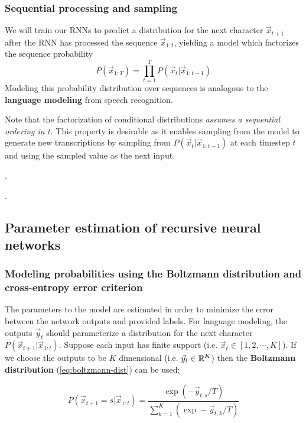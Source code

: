 \subsubsection{Sequential processing and sampling}

We will train our RNNs to predict a distribution for the next character
$\vec{x}_{t+1}$ after the RNN has processed the sequence $\vec{x}_{1:t}$,
yielding a model which factorizes the sequence probability
\begin{equation}
    P(\vec{x}_{1:T}) = \prod_{t=1}^T P(\vec{x}_t | \vec{x}_{1:t-1} )
\end{equation}
Modeling this probability distribution over sequences is analogous to the
\textbf{language modeling} from speech recognition.

Note that the factorization of conditional distributions \emph{assumes a
sequential ordering in $t$}. This property is desirable as it enables sampling
from the model to generate new transcriptions by sampling from $P(\vec{x}_t |
\vec{x}_{1:t-1})$ at each timestep $t$ and using the sampled value as the next
input.

.

.

\subsection{Parameter estimation of recursive neural networks}

\subsubsection{Modeling probabilities using the Boltzmann distribution and cross-entropy error criterion}

The parameters to the model are estimated in order to minimize the error
between the network outputs and provided labels. For language modeling, the
outputs $\vec{y}_t$ should parameterize a distribution for the next character
$P(\vec{x}_{t+1} | \vec{x}_{1:t})$. Suppose each input has finite support (i.e.
$\vec{x}_t \in [1,2,\cdots,K]$). If we choose the outputs to be $K$ dimensional
(i.e. $\vec{y}_t \in \mathbb{R}^K$) then the \textbf{Boltzmann distribution}
(\autoref{eq:boltzmann-dist}) can be used:

\begin{equation}
    \label{eq:boltzmann-dist}
    P(\vec{x}_{t+1} = s | \vec{x}_{1:t})
    = \frac{\exp \left(-\vec{y}_{t,s}/T\right) }{ \sum_{k=1}^{K} \left(\exp -\vec{y}_{t,k}/T\right)}
\end{equation}

